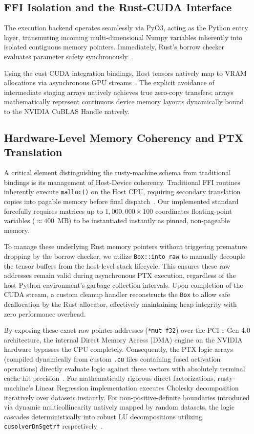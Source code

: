 \documentclass[conference]{IEEEtran}
\begin{document}
\subsection{FFI Isolation and the Rust-CUDA Interface}
The execution backend operates seamlessly via PyO3, acting as the Python entry layer, transmuting incoming multi-dimensional Numpy variables inherently into isolated contiguous memory pointers. Immediately, Rust's borrow checker evaluates parameter safety synchronously~\cite{ref13}.

Using the cust CUDA integration bindings, Host tensors natively map to VRAM allocations via asynchronous GPU streams~\cite{ref29,ref22}. The explicit avoidance of intermediate staging arrays natively achieves true zero-copy transfers; arrays mathematically represent continuous device memory layouts dynamically bound to the NVIDIA CuBLAS Handle natively.

\subsection{Hardware-Level Memory Coherency and PTX Translation}
A critical element distinguishing the rusty-machine schema from traditional bindings is its management of Host-Device coherency. Traditional FFI routines inherently execute \texttt{malloc()} on the Host CPU, requiring secondary translation copies into pagable memory before final dispatch~\cite{ref6}. Our implemented standard forcefully requires matrices up to $1,000,000 \times 100$ coordinates floating-point variables ($\approx 400$~MB) to be instantiated instantly as pinned, non-pageable memory. 

To manage these underlying Rust memory pointers without triggering premature dropping by the borrow checker, we utilize \texttt{Box::into\_raw} to manually decouple the tensor buffers from the host-level stack lifecycle. This ensures these raw addresses remain valid during asynchronous PTX execution, regardless of the host Python environment's garbage collection intervals. Upon completion of the CUDA stream, a custom cleanup handler reconstructs the \texttt{Box} to allow safe deallocation by the Rust allocator, effectively maintaining heap integrity with zero performance overhead.

By exposing these exact raw pointer addresses (\texttt{*mut f32}) over the PCI-e Gen 4.0 architecture, the internal Direct Memory Access (DMA) engine on the NVIDIA hardware bypasses the CPU completely. Consequently, the PTX logic arrays (compiled dynamically from custom \texttt{.cu} files containing fused activation operations) directly evaluate logic against these vectors with absolutely terminal cache-hit precision~\cite{ref21}. For mathematically rigorous direct factorizations, rusty-machine's Linear Regression implementation executes Cholesky decomposition iteratively over datasets instantly. For non-positive-definite boundaries introduced via dynamic multicollinearity natively mapped by random datasets, the logic cascades deterministically into robust LU decompositions utilizing \texttt{cusolverDnSgetrf} respectively~\cite{ref25}.
\end{document}
